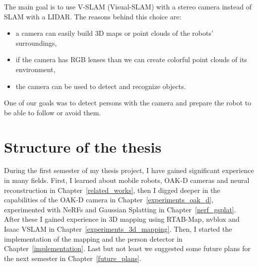 The main goal is to use V-SLAM (Visual-SLAM) with a stereo camera instead of SLAM with a LIDAR. The reasons behind this choice are:
\begin{itemize}
\setlength\itemsep{0em}
    \item a camera can easily build 3D maps or point clouds of the robots' surroundings,
    \item if the camera has RGB lenses than we can create colorful point clouds of its environment,
    \item the camera can be used to detect and recognize objects.
\end{itemize}
One of our goals was to detect persons with the camera and prepare the robot to be able to follow or avoid them.

\section{Structure of the thesis}

During the first semester of my thesis project, I have gained significant experience in many fields. First, I learned about mobile robots, OAK-D cameras and neural reconstruction in Chapter~\ref{related_works}, then I digged deeper in the capabilities of the OAK-D camera in Chapter~\ref{experiments_oak_d}, experimented with NeRFs and Gaussian Splatting in Chapter~\ref{nerf_gsplat}. After these I gained experience in 3D mapping using RTAB-Map, nvblox and Isaac VSLAM in Chapter~\ref{experiments_3d_mapping}. Then, I started the implementation of the mapping and the person detector in Chapter~\ref{implementation}. Last but not least we suggested some future plans for the next semester in Chapter~\ref{future_plans}.
